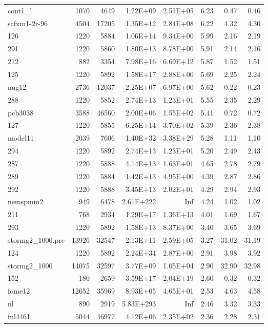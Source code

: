 \documentclass[10pt]{article}
\begin{document}
\begin{longtable}{|l|r|r|r|r|r|r|r|}
cont1\_l	&	1070	&	4649	&	1.22E+09	&	2.51E+05	&	6.23	&	0.47	&	0.46	\\
scfxm1-2r-96	&	4504	&	17205	&	1.35E+12	&	2.84E+08	&	6.22	&	4.32	&	4.30	\\
126	&	1220	&	5884	&	1.06E+14	&	9.34E+00	&	5.99	&	2.16	&	2.19	\\
291	&	1220	&	5860	&	1.80E+13	&	8.78E+00	&	5.91	&	2.14	&	2.16	\\
212	&	882	&	3354	&	7.98E+16	&	6.69E+12	&	5.87	&	1.52	&	1.51	\\
125	&	1220	&	5892	&	1.58E+17	&	2.88E+00	&	5.69	&	2.25	&	2.24	\\
nug12	&	2736	&	12037	&	2.25E+07	&	6.97E+00	&	5.62	&	0.22	&	0.23	\\
288	&	1220	&	5852	&	2.74E+13	&	1.23E+01	&	5.55	&	2.35	&	2.29	\\
pcb3038	&	3588	&	46560	&	2.00E+06	&	1.55E+02	&	5.41	&	0.72	&	0.72	\\
127	&	1220	&	5855	&	6.25E+14	&	3.70E+02	&	5.39	&	2.36	&	2.38	\\
model11	&	2039	&	7606	&	1.40E+32	&	3.38E+29	&	5.28	&	1.11	&	1.10	\\
294	&	1220	&	5892	&	2.74E+13	&	1.23E+01	&	5.20	&	2.49	&	2.43	\\
287	&	1220	&	5888	&	4.14E+13	&	1.63E+01	&	4.65	&	2.78	&	2.79	\\
289	&	1220	&	5884	&	1.42E+13	&	4.95E+00	&	4.39	&	2.87	&	2.86	\\
292	&	1220	&	5888	&	3.45E+13	&	2.02E+01	&	4.29	&	2.94	&	2.93	\\
nemspmm2	&	949	&	6478	&	2.61E+222	&	Inf	&	4.24	&	1.02	&	1.02	\\
211	&	768	&	2934	&	1.29E+17	&	1.36E+13	&	4.01	&	1.69	&	1.67	\\
293	&	1220	&	5892	&	1.58E+13	&	8.37E+00	&	3.40	&	3.65	&	3.69	\\
stormg2\_1000.pre	&	13926	&	32547	&	2.13E+11	&	2.59E+05	&	3.27	&	31.02	&	31.19	\\
124	&	1220	&	5892	&	2.24E+34	&	2.87E+00	&	2.91	&	3.98	&	3.92	\\
stormg2\_1000	&	14075	&	32597	&	3.77E+09	&	1.05E+04	&	2.90	&	32.90	&	32.98	\\
152	&	180	&	2659	&	3.59E+17	&	2.04E+19	&	2.60	&	0.32	&	0.32	\\
fome12	&	12652	&	35969	&	8.93E+05	&	4.65E+01	&	2.53	&	4.63	&	4.58	\\
nl	&	890	&	2919	&	5.83E+293	&	Inf	&	2.46	&	3.32	&	3.33	\\
fnl4461	&	5044	&	46977	&	4.12E+06	&	2.35E+02	&	2.36	&	2.28	&	2.31	\\

\end{longtable}
\end{document}
